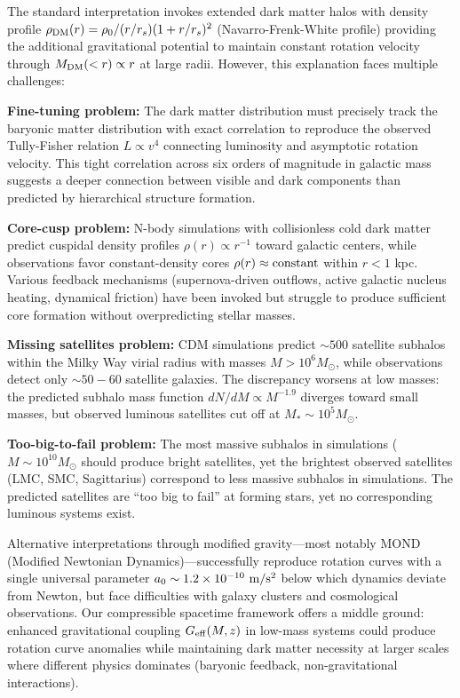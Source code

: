 \documentclass[10pt,a4paper]{article}
\begin{document}
The standard interpretation invokes extended dark matter halos with
density profile \(\rho_{\rm DM}(r) = \rho_0/(r/r_s)(1+r/r_s)^2\)
(Navarro-Frenk-White profile) providing the additional gravitational
potential to maintain constant rotation velocity through
\(M_{\rm DM}(<r) \propto r\) at large radii. However, this explanation
faces multiple challenges:

\textbf{Fine-tuning problem:} The dark matter distribution must
precisely track the baryonic matter distribution with exact correlation
to reproduce the observed Tully-Fisher relation \(L \propto v^4\)
connecting luminosity and asymptotic rotation velocity. This tight
correlation across six orders of magnitude in galactic mass suggests a
deeper connection between visible and dark components than predicted by
hierarchical structure formation.

\textbf{Core-cusp problem:} N-body simulations \cite{Springel2005} with collisionless cold
dark matter predict cuspidal density profiles \(\rho(r) \propto r^{-1}\)
toward galactic centers, while observations favor constant-density cores
\(\rho(r) \approx {\rm constant}\) within \(r < 1\) kpc. Various
feedback mechanisms (supernova-driven outflows, active galactic nucleus
heating, dynamical friction) have been invoked but struggle to produce
sufficient core formation without overpredicting stellar masses.

\textbf{Missing satellites problem:} CDM simulations predict
\(\sim 500\) satellite subhalos within the Milky Way virial radius with
masses \(M > 10^6 M_\odot\), while observations detect only
\(\sim 50-60\) satellite galaxies. The discrepancy worsens at low
masses: the predicted subhalo mass function \(dN/dM \propto M^{-1.9}\)
diverges toward small masses, but observed luminous satellites cut off
at \(M_* \sim 10^5 M_\odot\).

\textbf{Too-big-to-fail problem:} The most massive subhalos in
simulations (\(M \sim 10^{10} M_\odot\) should produce bright
satellites, yet the brightest observed satellites (LMC, SMC,
Sagittarius) correspond to less massive subhalos in simulations. The
predicted satellites are ``too big to fail'' at forming stars, yet no
corresponding luminous systems exist.

Alternative interpretations through modified gravity---most notably MOND
(Modified Newtonian Dynamics)---successfully reproduce rotation curves
with a single universal parameter
\(a_0 \sim 1.2 \times 10^{-10}~{\rm m/s^2}\) below which dynamics
deviate from Newton, but face difficulties with galaxy clusters and
cosmological observations. Our compressible spacetime framework offers a
middle ground: enhanced gravitational coupling \(G_{\rm eff}(M,z)\) in
low-mass systems could produce rotation curve anomalies while
maintaining dark matter necessity at larger scales where different
physics dominates (baryonic feedback, non-gravitational interactions).
\end{document}
